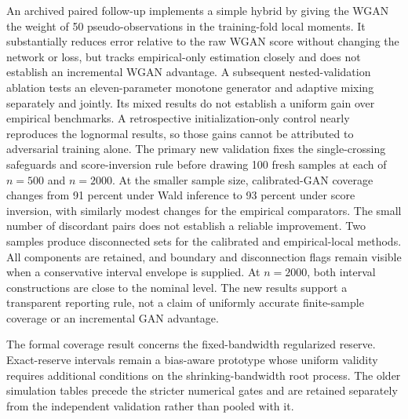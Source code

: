 An archived paired follow-up implements a simple hybrid by giving the WGAN the weight
of 50 pseudo-observations in the training-fold local moments. It substantially
reduces error relative to the raw WGAN score without changing the network or
loss, but tracks empirical-only estimation closely and does not establish an
incremental WGAN advantage. A subsequent nested-validation ablation tests an
eleven-parameter monotone generator and adaptive mixing separately and jointly.
Its mixed results do not establish a uniform gain over empirical benchmarks.
A retrospective initialization-only control nearly reproduces the lognormal
results, so those gains cannot be attributed to adversarial training alone.
The primary new validation fixes the single-crossing safeguards and
score-inversion rule before drawing 100 fresh samples at each of $n=500$
and $n=2000$.
At the smaller sample size, calibrated-GAN coverage changes from 91 percent
under Wald inference to 93 percent under score inversion, with similarly
modest changes for the empirical comparators. The small number of discordant
pairs does not establish a reliable improvement. Two samples produce
disconnected sets for the calibrated and empirical-local methods. All
components are retained, and boundary and disconnection flags remain visible
when a conservative interval envelope is supplied. At $n=2000$, both interval
constructions are close to the nominal level. The new results support a
transparent reporting rule, not a claim of uniformly accurate finite-sample
coverage or an incremental GAN advantage.

The formal coverage result concerns the fixed-bandwidth regularized reserve.
Exact-reserve intervals remain a bias-aware prototype whose uniform validity
requires additional conditions on the shrinking-bandwidth root process.
The older simulation tables precede the stricter numerical gates and are
retained separately from the independent validation rather than pooled with it.
